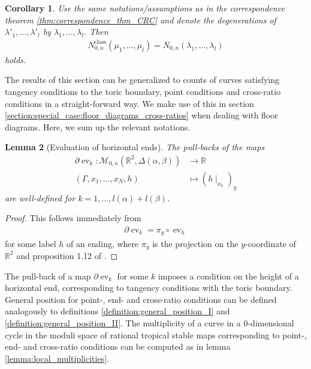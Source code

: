 \documentclass[11pt,reqno,a4]{amsart}
\theoremstyle{dotless}
\newtheorem{corollary}{Corollary}[section]
\newtheorem{lemma}[corollary]{Lemma}
\theoremstyle{definition}
\newcommand{\ev}{\operatorname{ev}}
\begin{document}
\begin{corollary}\label{corollary:ZSFSSG_section}
Use the same notations/assumptions as in the correspondence theorem \ref{thm:correspondence_thm_CRC} and denote the degenerations of $\lambda'_1,\dots,\lambda'_l$ by $\lambda_1,\dots,\lambda_l$. Then
\begin{align*}
N^{\textrm{class}}_{0,n}\left( \mu_1,\dots,\mu_l \right)
=
N_{0,n}\left(\lambda_1,\dots,\lambda_l\right)
\end{align*}
holds.
\end{corollary}


The results of this section can be generalized to counts of curves satisfying tangency conditions to the toric boundary, point conditions and cross-ratio conditions in a straight-forward way.
We make use of this in section \ref{section:special_case:floor_diagrams_cross-ratios} when dealing with floor diagrams. Here, we sum up the relevant notations.


\begin{lemma}[Evaluation of horizontal ends]\label{lemma:ev_horizontal_ends}
The pull-backs of the maps
\begin{align*}
\partial \ev_k:
\mathcal{M}_{0,n}\left(\mathbb{R}^2,\Delta\left(\alpha,\beta\right) \right)
&\to
\mathbb{R} \\
(\Gamma,x_1,\dots,x_N,h)
&\mapsto
\left( h\mid_{x_k} \right)_y
\end{align*}
are well-defined for $k=1,\dots,l(\alpha)+l(\beta)$.
\end{lemma}

\begin{proof}
This follows immediately from
\begin{align}\label{eq:delta_ev_equals_projection_ev}
\partial\ev_k=\pi_y\circ \ev_h
\end{align}
for some label $h$ of an ending, where $\pi_y$ is the projection on the $y$-coordinate of $\mathbb{R}^2$ and proposition 1.12 of \cite{JohannesIntersectionsonTropModuliSpaces}.
\end{proof}


The pull-back of a map $\partial \ev_k$ for some $k$ imposes a condition on the height of a horizontal end, corresponding to tangency conditions with the toric boundary. General position for point-, end- and cross-ratio conditions can be defined analogously to 
 definitions \ref{definition:general_position_I} and \ref{definition:general_position_II}. The multiplicity of a curve in a $0$-dimensional cycle in the moduli space of rational tropical stable maps corresponding to point-, end- and cross-ratio conditions can be computed as in lemma \ref{lemma:local_multiplicities}.
\end{document}

